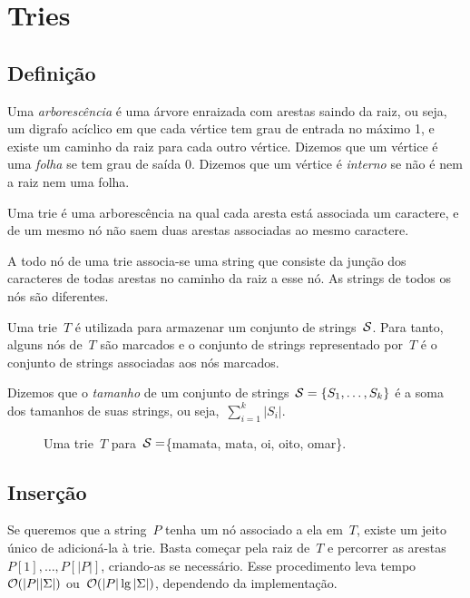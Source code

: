 \chapter{Tries} \label{chap:trie}

\section{Definição}
Uma \emph{arborescência} é uma árvore enraizada com arestas saindo da raiz, ou seja, um digrafo acíclico em que cada vértice tem grau de entrada no máximo 1, e existe um caminho da raiz para cada outro vértice. Dizemos que um vértice é uma \emph{folha} se tem grau de saída 0. Dizemos que um vértice é \emph{interno} se não é nem a raiz nem uma folha.

\begin{definition}
Uma trie é uma arborescência na qual cada aresta está associada um caractere, e de um mesmo nó não saem duas arestas associadas ao mesmo caractere.
\end{definition}

A todo nó de uma trie associa-se uma string que consiste da junção dos caracteres de todas arestas no caminho da raiz a esse nó. As strings de todos os nós são diferentes.

Uma trie~$T$ é utilizada para armazenar um conjunto de strings~$\mathcal{S}$. Para tanto, alguns nós de~$T$ são marcados e o conjunto de strings representado por~$T$ é o conjunto de strings associadas aos nós marcados.

Dizemos que o \emph{tamanho} de um conjunto de strings~${\mathcal{S} = \{S_1, \ldots, S_k\}}$ é a soma dos tamanhos de suas strings, ou seja,~$\sum\limits_{i=1}^k{|S_i|}$.


\begin{figure}
\centering
{}
\caption{Uma trie~$T$ para~$\mathcal{S} = $\{mamata, mata, oi, oito, omar\}.} \label{fig:triesimple}
\end{figure}


\section{Inserção} \label{sec:trieins}

Se queremos que a string~$P$ tenha um nó associado a ela em~$T$, existe um jeito único de adicioná-la à trie. Basta começar pela raiz de~$T$ e percorrer as arestas~$P[1], \dots, P[|P|]$, criando-as se necessário. Esse procedimento leva tempo~$\mathcal{O}(|P||\Sigma|)$ ou~$\mathcal{O}(|P|\lg|\Sigma|)$, dependendo da implementação.

